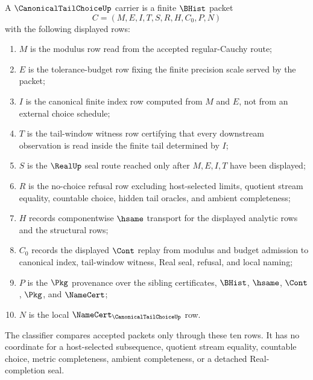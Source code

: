 \begin{definition}
\label{def:canonical-tail-choice-carrier}
A $\CanonicalTailChoiceUp$ carrier is a finite $\BHist$ packet
$$
C=(M,E,I,T,S,R,H,C_0,P,N)
$$
with the following displayed rows:
\begin{enumerate}
\item $M$ is the modulus row read from the accepted regular-Cauchy route;
\item $E$ is the tolerance-budget row fixing the finite precision scale served by the packet;
\item $I$ is the canonical finite index row computed from $M$ and $E$, not from an external choice schedule;
\item $T$ is the tail-window witness row certifying that every downstream observation is read inside the finite tail determined by $I$;
\item $S$ is the $\RealUp$ seal route reached only after $M,E,I,T$ have been displayed;
\item $R$ is the no-choice refusal row excluding host-selected limits, quotient stream equality, countable choice, hidden tail oracles, and ambient completeness;
\item $H$ records componentwise $\hsame$ transport for the displayed analytic rows and the structural rows;
\item $C_0$ records the displayed $\Cont$ replay from modulus and budget admission to canonical index, tail-window witness, Real seal, refusal, and local naming;
\item $P$ is the $\Pkg$ provenance over the sibling certificates, $\BHist$, $\hsame$, $\Cont$, $\Pkg$, and $\NameCert$;
\item $N$ is the local $\NameCert_{\CanonicalTailChoiceUp}$ row.
\end{enumerate}
The classifier compares accepted packets only through these ten rows. It has no coordinate for a host-selected subsequence, quotient stream equality, countable choice, metric completeness, ambient completeness, or a detached Real-completion seal.
\end{definition}

